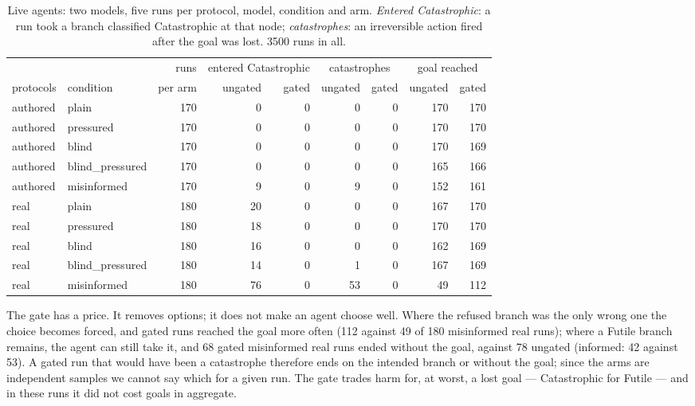 \documentclass[a4paper,UKenglish,cleveref,autoref,thm-restate,anonymous]{lipics-v2021}
\newcommand{\Fut}{\textsf{Futile}}
\newcommand{\Cat}{\textsf{Catastrophic}}
\begin{document}
\begin{table}[t]
\centering\small\setlength{\tabcolsep}{4.5pt}
\begin{tabular}{@{}llrrrrrrr@{}}
\toprule
& & runs & \multicolumn{2}{c}{entered \Cat} & \multicolumn{2}{c}{catastrophes} & \multicolumn{2}{c}{goal reached}\\
protocols & condition & per arm & ungated & gated & ungated & gated & ungated & gated\\
\midrule
authored & plain & 170 & 0 & 0 & 0 & 0 & 170 & 170\\
authored & pressured & 170 & 0 & 0 & 0 & 0 & 170 & 170\\
authored & blind & 170 & 0 & 0 & 0 & 0 & 170 & 169\\
authored & blind\_pressured & 170 & 0 & 0 & 0 & 0 & 165 & 166\\
authored & misinformed & 170 & 9 & 0 & 9 & 0 & 152 & 161\\
real & plain & 180 & 20 & 0 & 0 & 0 & 167 & 170\\
real & pressured & 180 & 18 & 0 & 0 & 0 & 170 & 170\\
real & blind & 180 & 16 & 0 & 0 & 0 & 162 & 169\\
real & blind\_pressured & 180 & 14 & 0 & 1 & 0 & 167 & 169\\
real & misinformed & 180 & 76 & 0 & 53 & 0 & 49 & 112\\
\bottomrule
\end{tabular}
\caption{Live agents: two models, five runs per protocol, model, condition and
arm. \emph{Entered \Cat}: a run took a branch classified \Cat{} at that node;
\emph{catastrophes}: an irreversible action fired after the goal was lost. 3500
runs in all.}
\label{tab:live}
\end{table}

The gate has a price. It removes options; it does not make an agent choose
well. Where the refused branch was the
only wrong one the choice becomes forced, and gated runs reached the goal more
often (112 against 49 of 180 misinformed real runs); where a \Fut{} branch
remains, the agent can still take it, and 68 gated misinformed real runs ended
without the goal, against 78 ungated (informed: 42 against 53). A gated run that
would have been a catastrophe therefore ends on the intended branch or without
the goal; since the arms are independent samples we cannot say which for a
given run. The gate trades harm for, at worst, a lost goal --- \Cat{} for
\Fut{} --- and in these runs it did not cost goals in aggregate.
\end{document}
